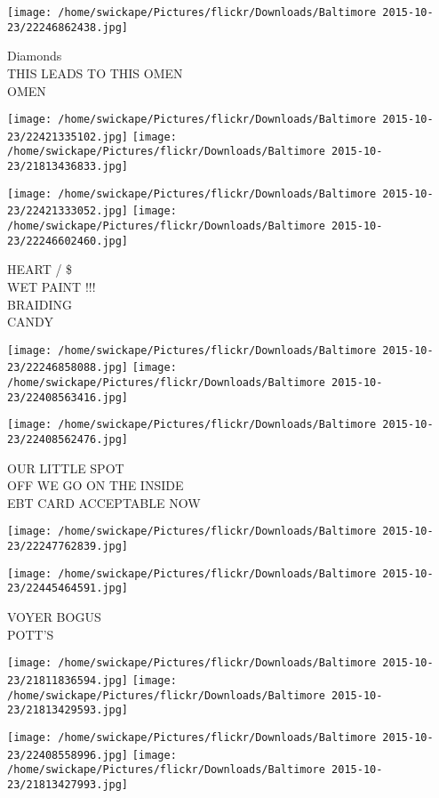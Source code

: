 \documentclass[10pt,letterpaper]{article}
\begin{document}
\vspace{0.25in}
\texttt{[image: /home/swickape/Pictures/flickr/Downloads/Baltimore 2015-10-23/22246862438.jpg]}

Diamonds\\
THIS LEADS TO THIS OMEN\\
OMEN
\pagebreak

\texttt{[image: /home/swickape/Pictures/flickr/Downloads/Baltimore 2015-10-23/22421335102.jpg]}
\texttt{[image: /home/swickape/Pictures/flickr/Downloads/Baltimore 2015-10-23/21813436833.jpg]}

\texttt{[image: /home/swickape/Pictures/flickr/Downloads/Baltimore 2015-10-23/22421333052.jpg]}
\texttt{[image: /home/swickape/Pictures/flickr/Downloads/Baltimore 2015-10-23/22246602460.jpg]}

HEART / \$\\
WET PAINT !!!\\
BRAIDING\\
CANDY
\pagebreak

\texttt{[image: /home/swickape/Pictures/flickr/Downloads/Baltimore 2015-10-23/22246858088.jpg]}
\texttt{[image: /home/swickape/Pictures/flickr/Downloads/Baltimore 2015-10-23/22408563416.jpg]}

\texttt{[image: /home/swickape/Pictures/flickr/Downloads/Baltimore 2015-10-23/22408562476.jpg]}

OUR LITTLE SPOT\\
OFF WE GO ON THE INSIDE\\
EBT CARD ACCEPTABLE NOW
\pagebreak

\texttt{[image: /home/swickape/Pictures/flickr/Downloads/Baltimore 2015-10-23/22247762839.jpg]}

\vspace{0.25in}
\texttt{[image: /home/swickape/Pictures/flickr/Downloads/Baltimore 2015-10-23/22445464591.jpg]}

VOYER BOGUS\\
POTT'S
\pagebreak

\texttt{[image: /home/swickape/Pictures/flickr/Downloads/Baltimore 2015-10-23/21811836594.jpg]}
\texttt{[image: /home/swickape/Pictures/flickr/Downloads/Baltimore 2015-10-23/21813429593.jpg]}

\texttt{[image: /home/swickape/Pictures/flickr/Downloads/Baltimore 2015-10-23/22408558996.jpg]}
\texttt{[image: /home/swickape/Pictures/flickr/Downloads/Baltimore 2015-10-23/21813427993.jpg]}
\end{document}
